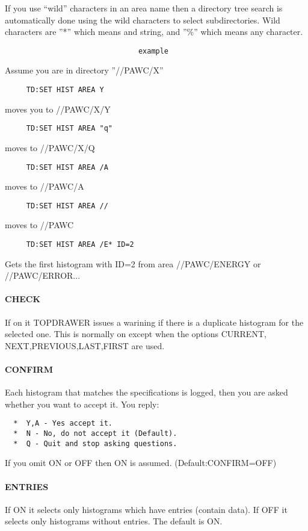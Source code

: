 If  you  use  ``wild'' characters in an area name then a directory tree
search is automatically done using  the  wild  characters  to  select
subdirectories.   Wild characters are ''*'' which means and string, and
''\%'' which means any character.  

\begin{verbatim}
                               example
\end{verbatim}
Assume you are in directory ''//PAWC/X'' 
\begin{verbatim}
     TD:SET HIST AREA Y 
\end{verbatim}
moves you to //PAWC/X/Y 
\begin{verbatim}
     TD:SET HIST AREA "q" 
\end{verbatim}
moves to //PAWC/X/Q 
\begin{verbatim}
     TD:SET HIST AREA /A 
\end{verbatim}
moves to //PAWC/A 
\begin{verbatim}
     TD:SET HIST AREA // 
\end{verbatim}
moves to //PAWC 
\begin{verbatim}
     TD:SET HIST AREA /E* ID=2 
\end{verbatim}
Gets  the  first  histogram  with  ID=2  from  area  //PAWC/ENERGY or
//PAWC/ERROR...  
\paragraph{CHECK}
If  on  it  TOPDRAWER  issues  a  warining  if  there  is a duplicate
histogram for the selected one.  This is normally on except when  the
options CURRENT, NEXT,PREVIOUS,LAST,FIRST are used.  
\paragraph{CONFIRM}
Each  histogram  that  matches the specifications is logged, then you
are asked whether you want to accept it.  You reply:  
\begin{verbatim}
  *  Y,A - Yes accept it.  
  *  N - No, do not accept it (Default).  
  *  Q - Quit and stop asking questions.  
\end{verbatim}
If you omit ON or OFF then ON is assumed.  (Default:CONFIRM=OFF) 
\paragraph{ENTRIES}
If  ON  it selects only histograms which have entries (contain data).
If OFF it selects only histograms without entries.   The  default  is
ON.  
